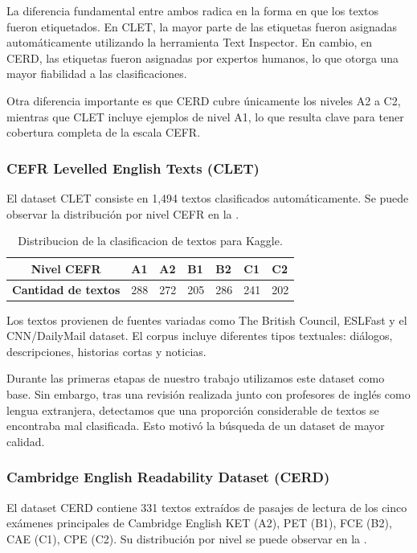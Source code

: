 La diferencia fundamental entre ambos radica en la forma en que los textos fueron etiquetados. En CLET, la mayor parte de las etiquetas fueron asignadas automáticamente utilizando la herramienta Text Inspector. En cambio, en CERD, las etiquetas fueron asignadas por expertos humanos, lo que otorga una mayor fiabilidad a las clasificaciones.

Otra diferencia importante es que CERD cubre únicamente los niveles A2 a C2, mientras que CLET incluye ejemplos de nivel A1, lo que resulta clave para tener cobertura completa de la escala CEFR.

\subsubsection{CEFR Levelled English Texts (CLET)}

El dataset CLET consiste en 1,494 textos clasificados automáticamente. Se puede observar la distribución por nivel CEFR en la .
\begin{table}[H]
\centering
\begin{tabular}{@{}cllllll@{}}
\toprule
\textbf{Nivel CEFR}         & A1  & A2  & B1  & B2  & C1  & C2  \\ \midrule
\textbf{Cantidad de textos} & 288 & 272 & 205 & 286 & 241 & 202 \\ \bottomrule
\end{tabular}
\caption{Distribucion de la clasificacion de textos para Kaggle.}
\label{tab:kaggle}
\end{table}

Los textos provienen de fuentes variadas como The British Council, ESLFast y el CNN/DailyMail dataset. El corpus incluye diferentes tipos textuales: diálogos, descripciones, historias cortas y noticias.

Durante las primeras etapas de nuestro trabajo utilizamos este dataset como base. Sin embargo, tras una revisión realizada junto con profesores de inglés como lengua extranjera, detectamos que una proporción considerable de textos se encontraba mal clasificada. Esto motivó la búsqueda de un dataset de mayor calidad.

\subsubsection{Cambridge English Readability Dataset (CERD)}
El dataset CERD contiene 331 textos extraídos de pasajes de lectura de los cinco exámenes principales de Cambridge English KET (A2), PET (B1), FCE (B2), CAE (C1), CPE (C2). Su distribución por nivel se puede observar en la .

